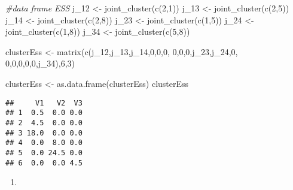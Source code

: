 \documentclass[
]{article}
\newenvironment{Shaded}{\begin{snugshade}}{\end{snugshade}}
\newcommand{\CommentTok}[1]{\textcolor[rgb]{0.56,0.35,0.01}{\textit{#1}}}
\newcommand{\DecValTok}[1]{\textcolor[rgb]{0.00,0.00,0.81}{#1}}
\newcommand{\FunctionTok}[1]{\textcolor[rgb]{0.00,0.00,0.00}{#1}}
\newcommand{\NormalTok}[1]{#1}
\newcommand{\OtherTok}[1]{\textcolor[rgb]{0.56,0.35,0.01}{#1}}
\providecommand{\tightlist}{%
  \setlength{\itemsep}{0pt}\setlength{\parskip}{0pt}}
\begin{document}
\begin{Shaded}
\begin{Highlighting}[]
\CommentTok{\#data frame ESS}
\NormalTok{j\_12 }\OtherTok{\textless{}{-}} \FunctionTok{joint\_cluster}\NormalTok{(}\FunctionTok{c}\NormalTok{(}\DecValTok{2}\NormalTok{,}\DecValTok{1}\NormalTok{))}
\NormalTok{j\_13 }\OtherTok{\textless{}{-}} \FunctionTok{joint\_cluster}\NormalTok{(}\FunctionTok{c}\NormalTok{(}\DecValTok{2}\NormalTok{,}\DecValTok{5}\NormalTok{))}
\NormalTok{j\_14 }\OtherTok{\textless{}{-}} \FunctionTok{joint\_cluster}\NormalTok{(}\FunctionTok{c}\NormalTok{(}\DecValTok{2}\NormalTok{,}\DecValTok{8}\NormalTok{))}
\NormalTok{j\_23 }\OtherTok{\textless{}{-}} \FunctionTok{joint\_cluster}\NormalTok{(}\FunctionTok{c}\NormalTok{(}\DecValTok{1}\NormalTok{,}\DecValTok{5}\NormalTok{))}
\NormalTok{j\_24 }\OtherTok{\textless{}{-}} \FunctionTok{joint\_cluster}\NormalTok{(}\FunctionTok{c}\NormalTok{(}\DecValTok{1}\NormalTok{,}\DecValTok{8}\NormalTok{))}
\NormalTok{j\_34 }\OtherTok{\textless{}{-}} \FunctionTok{joint\_cluster}\NormalTok{(}\FunctionTok{c}\NormalTok{(}\DecValTok{5}\NormalTok{,}\DecValTok{8}\NormalTok{))}

\NormalTok{clusterEss }\OtherTok{\textless{}{-}} \FunctionTok{matrix}\NormalTok{(}\FunctionTok{c}\NormalTok{(j\_12,j\_13,j\_14,}\DecValTok{0}\NormalTok{,}\DecValTok{0}\NormalTok{,}\DecValTok{0}\NormalTok{,}
                       \DecValTok{0}\NormalTok{,}\DecValTok{0}\NormalTok{,}\DecValTok{0}\NormalTok{,j\_23,j\_24,}\DecValTok{0}\NormalTok{,}
                       \DecValTok{0}\NormalTok{,}\DecValTok{0}\NormalTok{,}\DecValTok{0}\NormalTok{,}\DecValTok{0}\NormalTok{,}\DecValTok{0}\NormalTok{,j\_34),}\DecValTok{6}\NormalTok{,}\DecValTok{3}\NormalTok{)}

\NormalTok{clusterEss }\OtherTok{\textless{}{-}} \FunctionTok{as.data.frame}\NormalTok{(clusterEss)}
\NormalTok{clusterEss}
\end{Highlighting}
\end{Shaded}

\begin{verbatim}
##     V1   V2  V3
## 1  0.5  0.0 0.0
## 2  4.5  0.0 0.0
## 3 18.0  0.0 0.0
## 4  0.0  8.0 0.0
## 5  0.0 24.5 0.0
## 6  0.0  0.0 4.5
\end{verbatim}

\begin{enumerate}
\def\labelenumi{\Alph{enumi})}
\setcounter{enumi}{2}
\tightlist
\item
\end{enumerate}
\end{document}
